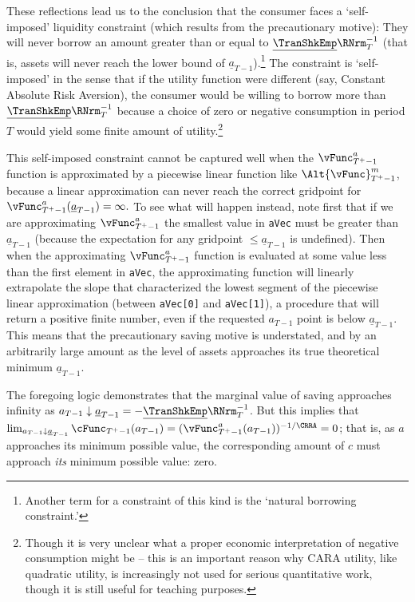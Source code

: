 \documentclass[titlepage, headings=optiontotocandhead]{\econtex}
\begin{document}
These reflections lead us to the conclusion that the consumer faces a
`self-imposed' liquidity constraint (which results from the
precautionary motive): They will never borrow an amount greater
than or equal to $\underline{\TranShkEmp}\RNrm_{T}^{-1}$ (that is,
assets will never reach the lower bound of
$\underline{a}_{T-1}$).\footnote{Another term for a constraint of this
  kind is the `natural borrowing constraint.'}  The constraint is
`self-imposed' in the sense that if the utility function were
different (say, Constant Absolute Risk Aversion), the consumer would
be willing to borrow more than $\underline{\TranShkEmp}\RNrm_{T}^{-1}$
because a choice of zero or negative consumption in period $T$ would
yield some finite amount of utility.\footnote{Though it is very unclear what a
  proper economic interpretation of negative consumption might be --
  this is an important reason why CARA utility, like quadratic utility,
  is increasingly not used for serious quantitative work, though it is
  still useful for teaching purposes.}

This self-imposed constraint cannot be captured well when the
$\vFunc^{{a}}_{T^{+}-1}$ function is approximated by a piecewise
linear function like $\Alt{\vFunc}^{{m}}_{T^{+}-1}$, because a
linear approximation can never reach the correct gridpoint for
$\vFunc^{{a}}_{T^{+}-1}(\underline{a}_{T-1})=\infty.$ To see what
will happen instead, note first that if we are approximating $\vFunc^{{a}}_{T^{+}-1}$ the smallest value in
\texttt{aVec} must be greater than $\underline{a}_{T-1}$
(because the expectation for any gridpoint $\leq \underline{a}_{T-1}$ is undefined).  Then when the
approximating $\vFunc^{{a}}_{T^{+}-1}$ function is evaluated at
some value less than the first element in \texttt{aVec}, the
approximating function will linearly extrapolate the slope that
characterized the lowest segment of the piecewise linear approximation
(between \texttt{aVec[0]} and \texttt{aVec[1]}), a
procedure that will return a positive finite number, even if the
requested ${a}_{T-1}$ point is below $\underline{a}_{T-1}$.  This means that the
precautionary saving motive is understated, and by an arbitrarily
large amount as the level of assets approaches its true theoretical
minimum $\underline{a}_{T-1}$.

The foregoing logic demonstrates that the marginal value of saving approaches infinity as ${a}_{T-1} \downarrow
\underline{a}_{T-1}=-\underline{\TranShkEmp}\RNrm_{T}^{-1}$.  But this
implies that $\lim_{{a}_{T-1} \downarrow \underline{a}_{T-1}}
\cFunc_{T^{+}-1}({a}_{T-1}) = (\vFunc^{{a}}_{T^{+}-1}({a}_{T-1}))^{-1/\CRRA} = 0$;
that is, as ${a}$ approaches its minimum possible value, the
corresponding amount of ${c}$ must approach \textit{its} minimum possible value: zero.
\end{document}

